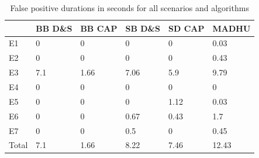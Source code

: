 \begin{appendix}
\begin{table}[!ht]
\centering
\begin{tabular}{l|ll|ll|l}
\toprule
      & BB D\&S & BB CAP & SB D\&S & SD CAP & MADHU \\ \midrule
E1    & 0       & 0      & 0       & 0      & 0.03  \\
E2    & 0       & 0      & 0       & 0      & 0.43  \\
E3    & 7.1     & 1.66   & 7.06    & 5.9    & 9.79  \\
E4    & 0       & 0      & 0       & 0      & 0     \\
E5    & 0       & 0      & 0       & 1.12   & 0.03  \\
E6    & 0       & 0      & 0.67    & 0.43   & 1.7   \\
E7    & 0       & 0      & 0.5     & 0      & 0.45  \\ \midrule
Total & 7.1     & 1.66   & 8.22    & 7.46   & 12.43   \\
\bottomrule
\end{tabular}
\caption{False positive durations in seconds for all scenarios and algorithms}
\label{tab:fp}
\end{table}

\end{appendix}

